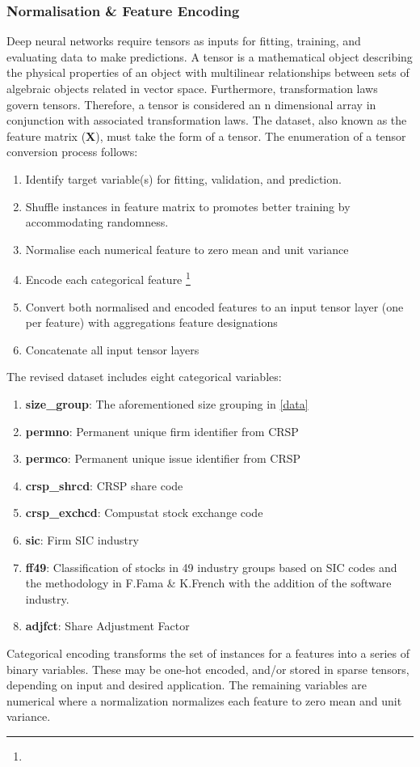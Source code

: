 \documentclass[12pt]{article}
\begin{document}
\subsubsection{Normalisation \& Feature Encoding}
Deep neural networks require tensors as inputs for fitting, training, and evaluating data to make predictions.
A tensor is a mathematical object describing the physical properties of an object with multilinear relationships between sets of algebraic objects related in vector space.
Furthermore, transformation laws govern tensors. 
Therefore, a tensor is considered an n dimensional array in conjunction with associated transformation laws.
The dataset, also known as the feature matrix (\textbf{X}), must take the form of a tensor.
The enumeration of a tensor conversion process follows:
\begin{enumerate} 
\item Identify target variable(s) for fitting, validation, and prediction.
\item Shuffle instances in feature matrix to promotes better training by accommodating randomness.
\item Normalise each numerical feature to zero mean and unit variance
\item Encode each categorical feature  \footnote{}
\item Convert both normalised and encoded features to an input tensor layer (one per feature) with aggregations feature designations
\item Concatenate all input tensor layers 
\end{enumerate}
The revised dataset includes eight categorical variables:
\begin{enumerate}
	\item \textbf{size\_group}: The aforementioned size grouping in \ref{data}
	\item \textbf{permno}: Permanent unique firm identifier from CRSP
	\item \textbf{permco}: Permanent unique issue identifier from CRSP
	\item \textbf{crsp\_shrcd}: CRSP share code
	\item \textbf{crsp\_exchcd}: Compustat stock exchange code
	\item \textbf{sic}: Firm SIC industry
	\item \textbf{ff49}: Classification of stocks in 49 industry groups based on SIC codes and the methodology in F.Fama \& K.French \citeyear{fama1997industry} with the addition of the software industry.
	\item \textbf{adjfct}: Share Adjustment Factor
\end{enumerate}
Categorical encoding transforms the set of instances for a features into a series of binary variables.
These may be one-hot encoded, and/or stored in sparse tensors, depending on input and desired application.
The remaining variables are numerical where a normalization normalizes each feature to zero mean and unit variance.
\end{document}
